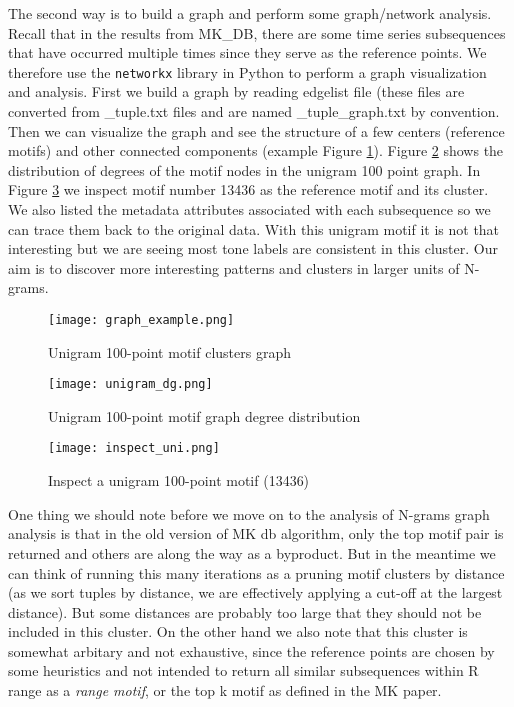 \documentclass[conference]{IEEEtran}
\begin{document}
The second way is to build a graph and perform some graph/network analysis. Recall that in the results from MK\_DB, there are some time series subsequences that have occurred multiple times since they serve as the reference points. We therefore use the \texttt{networkx} library in Python to perform a graph visualization and analysis. First we build a graph by reading edgelist file (these files are converted from \_tuple.txt files and are named \_tuple\_graph.txt by convention. Then we can visualize the graph and see the structure of a few centers (reference motifs) and other connected components (example Figure \ref{fig:graphex}). Figure \ref{fig:degreeuni} shows the distribution of degrees of the motif nodes in the unigram 100 point graph. In Figure \ref{fig:inspectuni} we inspect motif number 13436 as the reference motif and its cluster. We also listed the metadata attributes associated with each subsequence so we can trace them back to the original data. With this unigram motif it is not that interesting but we are seeing most tone labels are consistent in this cluster. Our aim is to discover more interesting patterns and clusters in larger units of N-grams.

\begin{figure}
\small
 \centerline{
 \texttt{[image: graph\_example.png]}}
 \caption{Unigram 100-point motif clusters graph}
 \label{fig:graphex}
\end{figure}

\begin{figure}
\small
 \centerline{
 \texttt{[image: unigram\_dg.png]}}
 \caption{Unigram 100-point motif graph degree distribution}
 \label{fig:degreeuni}
\end{figure}
\begin{figure}
\small
 \centerline{
 \texttt{[image: inspect\_uni.png]}}
 \caption{Inspect a unigram 100-point motif (13436)}
 \label{fig:inspectuni}
\end{figure}

One thing we should note before we move on to the analysis of N-grams graph analysis is that in the old version of MK db algorithm, only the top motif pair is returned and others are along the way as a byproduct. But in the meantime we can think of running this many iterations as a pruning motif clusters by distance (as we sort tuples by distance, we are effectively applying a cut-off at the largest distance). But some distances are probably too large that they should not be included in this cluster. On the other hand we also note that this cluster is somewhat arbitary and not exhaustive, since the reference points are chosen by some heuristics and not intended to return all similar subsequences within R range as a \textit{range motif}, or the top k motif as defined in the MK paper. 
\end{document}
